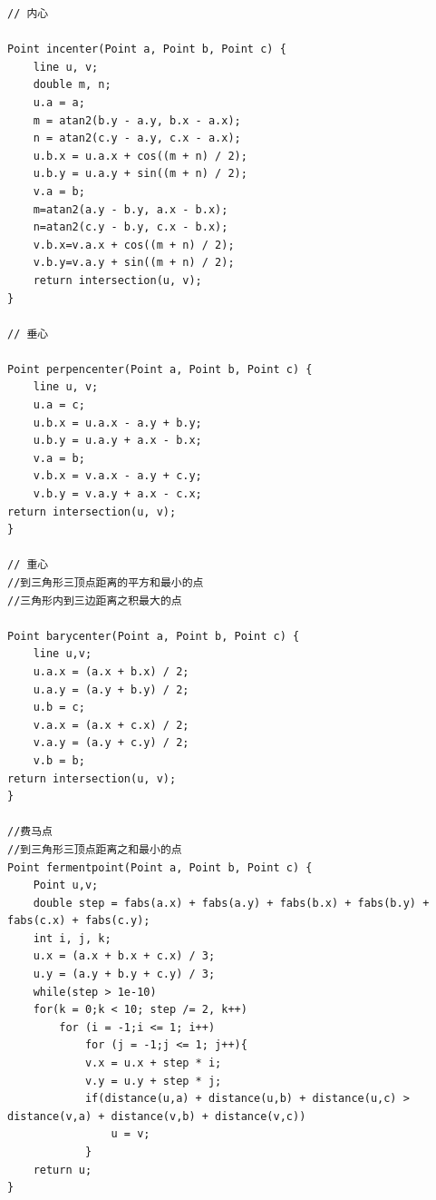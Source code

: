 \documentclass[twoside]{article}
\begin{document}
\begin{lstlisting}
// 内心

Point incenter(Point a, Point b, Point c) {
    line u, v;
    double m, n;
    u.a = a;
    m = atan2(b.y - a.y, b.x - a.x);
    n = atan2(c.y - a.y, c.x - a.x);
    u.b.x = u.a.x + cos((m + n) / 2);
    u.b.y = u.a.y + sin((m + n) / 2);
    v.a = b;
    m=atan2(a.y - b.y, a.x - b.x); 
    n=atan2(c.y - b.y, c.x - b.x); 
    v.b.x=v.a.x + cos((m + n) / 2); 
    v.b.y=v.a.y + sin((m + n) / 2);
    return intersection(u, v); 
}

// 垂心

Point perpencenter(Point a, Point b, Point c) {
    line u, v;
    u.a = c; 
    u.b.x = u.a.x - a.y + b.y; 
    u.b.y = u.a.y + a.x - b.x; 
    v.a = b; 
    v.b.x = v.a.x - a.y + c.y; 
    v.b.y = v.a.y + a.x - c.x; 
return intersection(u, v); 
}

// 重心
//到三角形三顶点距离的平方和最小的点 
//三角形内到三边距离之积最大的点 

Point barycenter(Point a, Point b, Point c) {
    line u,v; 
    u.a.x = (a.x + b.x) / 2; 
    u.a.y = (a.y + b.y) / 2; 
    u.b = c; 
    v.a.x = (a.x + c.x) / 2; 
    v.a.y = (a.y + c.y) / 2; 
    v.b = b; 
return intersection(u, v); 
}

//费马点 
//到三角形三顶点距离之和最小的点 
Point fermentpoint(Point a, Point b, Point c) { 
    Point u,v; 
    double step = fabs(a.x) + fabs(a.y) + fabs(b.x) + fabs(b.y) + fabs(c.x) + fabs(c.y); 
    int i, j, k; 
    u.x = (a.x + b.x + c.x) / 3; 
    u.y = (a.y + b.y + c.y) / 3; 
    while(step > 1e-10) 
    for(k = 0;k < 10; step /= 2, k++) 
        for (i = -1;i <= 1; i++) 
            for (j = -1;j <= 1; j++){ 
            v.x = u.x + step * i; 
            v.y = u.y + step * j; 
            if(distance(u,a) + distance(u,b) + distance(u,c) > distance(v,a) + distance(v,b) + distance(v,c)) 
                u = v; 
            } 
    return u; 
} \end{lstlisting}
\end{document}
